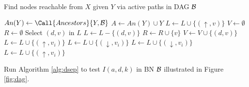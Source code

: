 \begin{algorithm}[htb]
\caption{\cite{koll09} Find nodes reachable from $X$ given $Y$ via active paths in DAG ${\cal B}$}
\label{alg:dsep}
\begin{algorithmic}[1]
	\State $An(Y) \leftarrow \Call{Ancestors}{Y,{\cal B}}$
	\State $A \leftarrow An(Y) \cup Y$
	 
		\State $L \leftarrow L \cup \{(\uparrow,v)\}$
	\EndFor
	\State $V \leftarrow \emptyset$ 
	\State $R \leftarrow \emptyset$ 
	 
		\State Select $(d,v)$ in $L$ \label{alg:lin_select_dsep}
		\State $L \leftarrow L - \{(d,v)\}$
				\State $R \leftarrow R \cup \{v\}$ 
			\EndIf
			\State $V \leftarrow V \cup \{(d,v)\}$ 
					\State $L \leftarrow L \cup \{(\uparrow,v_i)\}$
				\EndFor
					\State $L \leftarrow L \cup \{(\downarrow,v_i)\}$
				\EndFor
						\State $L \leftarrow L \cup \{(\downarrow,v_i)\}$
					\EndFor
				\EndIf
						\State $L \leftarrow L \cup \{(\uparrow,v_i)\}$
					\EndFor
				\EndIf
			\EndIf
		\EndIf
	\EndWhile
\EndProcedure
\end{algorithmic}
\end{algorithm}

\begin{example}
Run Algorithm \ref{alg:dsep} to test $I(a,d,k)$ in BN ${\cal B}$ illustrated in Figure \ref{fig:dag}.
\end{example}
